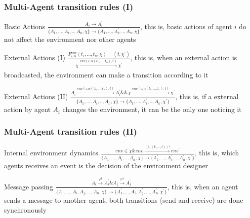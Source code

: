 \documentclass{beamer}
\begin{document}
\begin{frame}
\frametitle{Multi-Agent transition rules (I)}

\begin{block}{Basic Actions}
	$\frac{A_i \rightarrow A^{\prime}_i}{\{A_1,...,A_i,..,A_n,\chi\} \rightarrow \{A_1,...,A^{\prime}_i,..,A_n,\chi\}}$, this is, basic actions of agent $i$ do not affect the environment nor other agents 
\end{block}

\begin{block}{External Actions (I)}
	$\frac{F^{env}_{\iota,\alpha}(t_1,...,t_n,\chi) = (t, \chi^\prime)}{ \chi \xrightarrow[]{env(\iota,\alpha(t_1,...,t_n),t)} \chi^\prime}$, this is, when an external action is broadcasted, the environment can make a transition according to it
\end{block}

\begin{block}{External Actions (II)}
	$\frac{ A_i \xrightarrow[]{env(\iota,\alpha(t_1,...,t_n),t)} A^\prime_i \&\& \chi \xrightarrow[]{env(\iota,\alpha(t_1,...,t_n),t)} \chi^\prime}{\{A_1,...,A_i,..,A_n,\chi\} \rightarrow \{A_1,...,A^{\prime}_i,..,A_n,\chi^\prime\} }$, this is, if a external action by agent $A_i$ changes the environment, it can be the only one noticing it
\end{block}

\end{frame}


\begin{frame}
\frametitle{Multi-Agent transition rules (II)}

\begin{block}{Internal environment dynamics}
	$\frac{ env \in \chi \& env \xrightarrow{(\theta,(k,...,l))!} env^\prime}{\{A_1,...,A_i,..,A_n,\chi\} \rightarrow \{A^\prime_1,...,A^{\prime}_i,..,A^\prime_n,\chi^\prime\} }$, this is, which agents receives an event is the decision of the environment designer
\end{block}

\begin{block}{Message passing}
 $ \frac{A_i \xrightarrow[]{\varphi!} A^\prime_i \& A_j \xrightarrow[]{\varphi?} A^\prime_j}{\{A_1,...,A_i,A_j,...,A_n,\chi\} \rightarrow \{A^\prime_1,...,A^{\prime}_i,A^\prime_j,...,A^\prime_n,\chi^\prime\} } $, this is, when an agent sends a message to another agent, both transitions (send and receive) are done synchronously
\end{block}

\end{frame}
\end{document}
